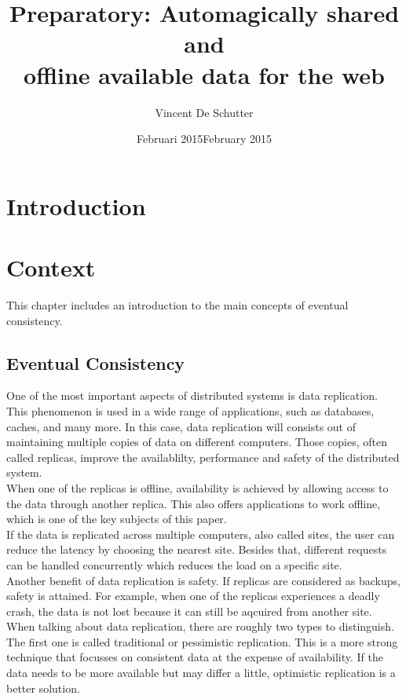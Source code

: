 \documentclass[a4paper,12pt]{report}
\author{Vincent De Schutter}
\title{Preparatory: Automagically shared and \\offline available data for the web}
\date{Februari 2015}
\begin{document}
\maketitlepage


\date{February 2015}

\maketitlepage

\tableofcontents
\newpage

\chapter{Introduction} %
\chapter{Context} %

This chapter includes an introduction to the main concepts of eventual consistency. 

\section{Eventual Consistency} 

One of the most important aspects of distributed systems is data replication. This phenomenon is used in a wide range of applications, such as databases, caches, and many more. In this case, data replication will consists out of maintaining multiple copies of data on different computers. Those copies, often called replicas, improve the availablilty, performance and safety of the distributed system. \\
When one of the replicas is offline, availability is achieved by allowing access to the data through another replica. This also offers applications to work offline, which is one of the key subjects of this paper. \\
If the data is replicated across multiple computers, also called sites, the user can reduce the latency by choosing the nearest site. Besides that, different requests can be handled concurrently which reduces the load on a specific site. \\
Another benefit of data replication is safety. If replicas are considered as backups, safety is attained. For example, when one of the replicas experiences a deadly crash, the data is not lost because it can still be aqcuired from another site.\\
\newline
When talking about data replication, there are roughly two types to distinguish. The first one is called traditional or pessimistic replication. This is a more strong technique that focusses on consistent data at the expense of availability. If the data needs to be more available but may differ a little, optimistic replication is a better solution.
\end{document}
